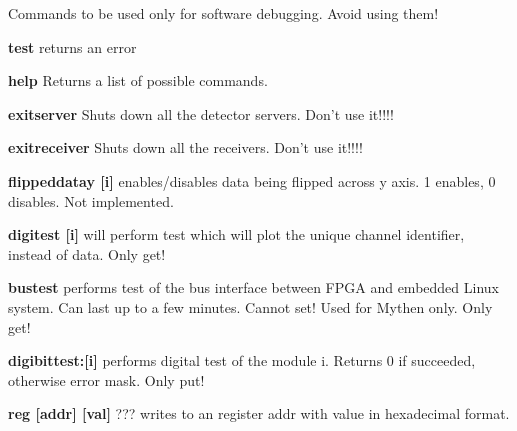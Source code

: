 Commands to be used only for software debugging. Avoid using them!
\begin{DoxyItemize}
\item {\bfseries test} returns an error
\end{DoxyItemize}


\begin{DoxyItemize}
\item {\bfseries help} Returns a list of possible commands.
\end{DoxyItemize}


\begin{DoxyItemize}
\item {\bfseries exitserver} Shuts down all the detector servers. Don't use it!!!!
\end{DoxyItemize}


\begin{DoxyItemize}
\item {\bfseries exitreceiver} Shuts down all the receivers. Don't use it!!!!
\end{DoxyItemize}


\begin{DoxyItemize}
\item {\bfseries flippeddatay \mbox{[}i\mbox{]}} enables/disables data being flipped across y axis. 1 enables, 0 disables. Not implemented.
\end{DoxyItemize}


\begin{DoxyItemize}
\item {\bfseries digitest \mbox{[}i\mbox{]}} will perform test which will plot the unique channel identifier, instead of data. Only get!
\end{DoxyItemize}


\begin{DoxyItemize}
\item {\bfseries bustest} performs test of the bus interface between FPGA and embedded Linux system. Can last up to a few minutes. Cannot set! Used for Mythen only. Only get!
\end{DoxyItemize}


\begin{DoxyItemize}
\item {\bfseries digibittest:\mbox{[}i\mbox{]}} performs digital test of the module i. Returns 0 if succeeded, otherwise error mask. Only put!
\end{DoxyItemize}


\begin{DoxyItemize}
\item {\bfseries reg \mbox{[}addr\mbox{]} \mbox{[}val\mbox{]}} ??? writes to an register {\ttfamily addr} with {\ttfamily value} in hexadecimal format.
\end{DoxyItemize}


